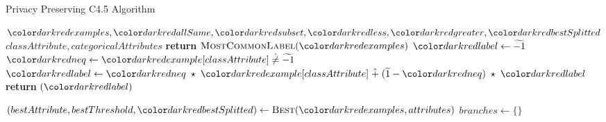 \begin{algorithm}[H]
\caption{Privacy Preserving C4.5 Algorithm}\label{a:c45-pp}
\begin{algorithmic}[1]
  \renewcommand{\algorithmicrequire}{\textbf{Private Vars:}}
  \Require $\red{examples}, {\red{allSame}}, \red{subset}, \red{less}, \red{greater}, \red{bestSplitted}$
  \renewcommand{\algorithmicrequire}{\textbf{Global Vars:}}
  \Require $classAttribute, categoricalAttributes$
          \State \textbf{return} $\textsc{MostCommonLabel}(\red{examples})$
      \State $\red{label} \gets \enc{-1}$
          \State $\red{neq} \gets \red{example}[classAttribute] \hneq \enc{-1}$
          \State $\red{label} \gets \red{neq} \hmul \red{example}[classAttribute] \hplus (\enc{1} - \red{neq}) \hmul \red{label} $
      \EndFor
      \State \textbf{return} {{}}$(\red{label})$
    \EndIf


    \State $(bestAttribute, bestThreshold, \red{bestSplitted}) \gets \textsc{Best}(\red{examples}, attributes)$
    \State $branches \gets \{\}$

    \end{algorithmic}
    \end{algorithm}
